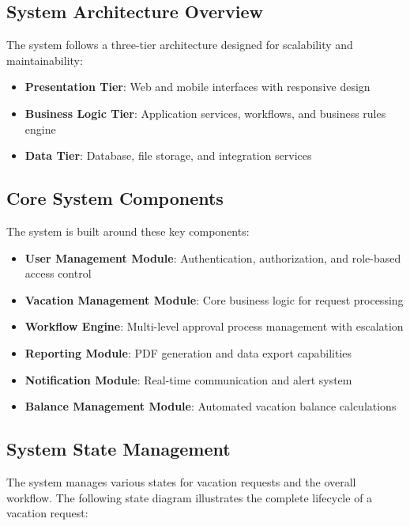 \documentclass[12pt,a4paper]{article}
\begin{document}
\subsection{System Architecture Overview}
The system follows a three-tier architecture designed for scalability and maintainability:

\begin{itemize}
    \item \textbf{Presentation Tier}: Web and mobile interfaces with responsive design
    \item \textbf{Business Logic Tier}: Application services, workflows, and business rules engine
    \item \textbf{Data Tier}: Database, file storage, and integration services
\end{itemize}

\subsection{Core System Components}
The system is built around these key components:

\begin{itemize}
    \item \textbf{User Management Module}: Authentication, authorization, and role-based access control
    \item \textbf{Vacation Management Module}: Core business logic for request processing
    \item \textbf{Workflow Engine}: Multi-level approval process management with escalation
    \item \textbf{Reporting Module}: PDF generation and data export capabilities
    \item \textbf{Notification Module}: Real-time communication and alert system
    \item \textbf{Balance Management Module}: Automated vacation balance calculations
\end{itemize}

\subsection{System State Management}
The system manages various states for vacation requests and the overall workflow. The following state diagram illustrates the complete lifecycle of a vacation request:
\end{document}
